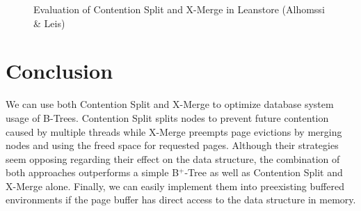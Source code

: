 \documentclass[acmlarge,nonacm,dvipsnames]{acmart}
\begin{document}
\begin{figure}
\caption{Evaluation of Contention Split and X-Merge in Leanstore \scriptsize (Alhomssi \& Leis)}
\label{fig:chart_3}
\end{figure}
\section{Conclusion}
We can use both Contention Split and X-Merge to optimize database system usage of B-Trees. Contention Split splits nodes to prevent future contention caused by multiple threads while X-Merge preempts page evictions by merging nodes and using the freed space for requested pages. Although their strategies seem opposing regarding their effect on the data structure, the combination of both approaches outperforms a simple B$^+$-Tree as well as Contention Split and X-Merge alone. Finally, we can easily implement them into preexisting buffered environments if the page buffer has direct access to the data structure in memory.



\end{document}
